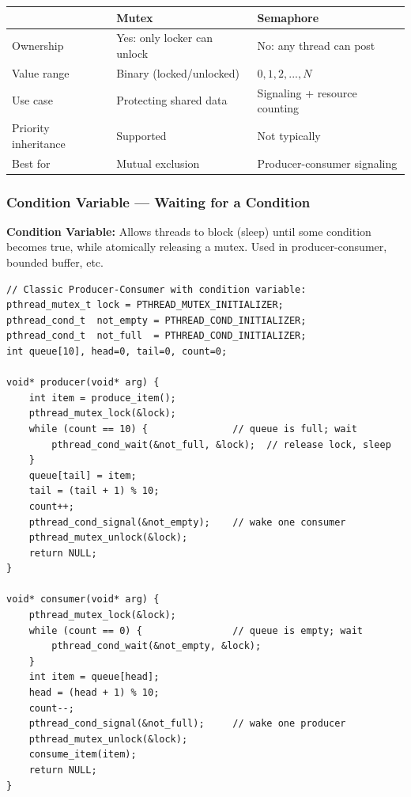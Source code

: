 \documentclass[11pt,a4paper]{article}
\begin{document}
\begin{center}
\begin{tabular}{L{5cm} L{4.5cm} L{4.5cm}}
\toprule
& \textbf{Mutex} & \textbf{Semaphore} \\
\midrule
Ownership & Yes: only locker can unlock & No: any thread can post \\
Value range & Binary (locked/unlocked) & $0, 1, 2, ..., N$ \\
Use case & Protecting shared data & Signaling + resource counting \\
Priority inheritance & Supported & Not typically \\
Best for & Mutual exclusion & Producer-consumer signaling \\
\bottomrule
\end{tabular}
\end{center}

\subsubsection{Condition Variable --- Waiting for a Condition}

\begin{mydef}
\textbf{Condition Variable:} Allows threads to block (sleep) until some condition becomes true, while atomically releasing a mutex. Used in producer-consumer, bounded buffer, etc.
\end{mydef}

\begin{lstlisting}
// Classic Producer-Consumer with condition variable:
pthread_mutex_t lock = PTHREAD_MUTEX_INITIALIZER;
pthread_cond_t  not_empty = PTHREAD_COND_INITIALIZER;
pthread_cond_t  not_full  = PTHREAD_COND_INITIALIZER;
int queue[10], head=0, tail=0, count=0;

void* producer(void* arg) {
    int item = produce_item();
    pthread_mutex_lock(&lock);
    while (count == 10) {               // queue is full; wait
        pthread_cond_wait(&not_full, &lock);  // release lock, sleep
    }
    queue[tail] = item;
    tail = (tail + 1) % 10;
    count++;
    pthread_cond_signal(&not_empty);    // wake one consumer
    pthread_mutex_unlock(&lock);
    return NULL;
}

void* consumer(void* arg) {
    pthread_mutex_lock(&lock);
    while (count == 0) {                // queue is empty; wait
        pthread_cond_wait(&not_empty, &lock);
    }
    int item = queue[head];
    head = (head + 1) % 10;
    count--;
    pthread_cond_signal(&not_full);     // wake one producer
    pthread_mutex_unlock(&lock);
    consume_item(item);
    return NULL;
}
\end{lstlisting}
\end{document}
